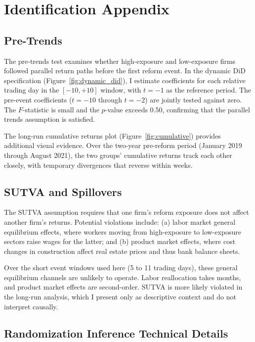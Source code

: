 \documentclass[12pt]{article}
\begin{document}
\section{Identification Appendix}\label{app:identification}

\subsection{Pre-Trends}

The pre-trends test examines whether high-exposure and low-exposure firms followed parallel return paths before the first reform event. In the dynamic DiD specification (Figure~\ref{fig:dynamic_did}), I estimate coefficients for each relative trading day in the $[-10, +10]$ window, with $t = -1$ as the reference period. The pre-event coefficients ($t = -10$ through $t = -2$) are jointly tested against zero. The $F$-statistic is small and the $p$-value exceeds 0.50, confirming that the parallel trends assumption is satisfied.

The long-run cumulative returns plot (Figure~\ref{fig:cumulative}) provides additional visual evidence. Over the two-year pre-reform period (January 2019 through August 2021), the two groups' cumulative returns track each other closely, with temporary divergences that reverse within weeks.

\subsection{SUTVA and Spillovers}

The SUTVA assumption requires that one firm's reform exposure does not affect another firm's returns. Potential violations include: (a) labor market general equilibrium effects, where workers moving from high-exposure to low-exposure sectors raise wages for the latter; and (b) product market effects, where cost changes in construction affect real estate prices and thus bank balance sheets.

Over the short event windows used here (5 to 11 trading days), these general equilibrium channels are unlikely to operate. Labor reallocation takes months, and product market effects are second-order. SUTVA is more likely violated in the long-run analysis, which I present only as descriptive context and do not interpret causally.

\subsection{Randomization Inference Technical Details}
\end{document}
